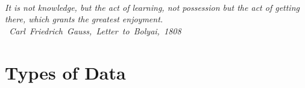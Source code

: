 \documentclass{tufte-book} %
\begin{document}

\tableofcontents %






\cleardoublepage
~\vfill
\begin{doublespace}
\noindent\fontsize{18}{22}\selectfont\itshape
\nohyphenation
It is not knowledge, but the act of learning, not possession but the act of getting there, which grants the greatest enjoyment.\\ \mbox{ Carl Friedrich Gauss, {\itshape Letter to Bolyai, 1808}}
\end{doublespace}
\vfill
\vfill

\cleardoublepage

\mainmatter

\chapter{Types of Data}
\end{document}
